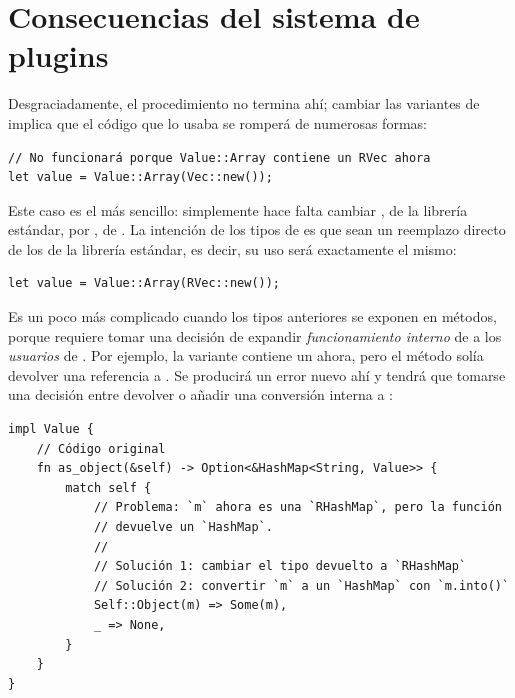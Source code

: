 \section{Consecuencias del sistema de plugins}

Desgraciadamente, el procedimiento no termina ahí; cambiar las variantes de
 implica que el código que lo usaba se romperá de numerosas formas:

\begin{verbatim}
// No funcionará porque Value::Array contiene un RVec ahora
let value = Value::Array(Vec::new());
\end{verbatim}

Este caso es el más sencillo: simplemente hace falta cambiar , de la
librería estándar, por , de \abistable. La intención de los tipos de
\abistable es que sean un reemplazo directo de los de la librería estándar, es
decir, su uso será exactamente el mismo:

\begin{verbatim}
let value = Value::Array(RVec::new());
\end{verbatim}

Es un poco más complicado cuando los tipos anteriores se exponen en métodos,
porque requiere tomar una decisión de expandir \emph{funcionamiento interno} de
 a los \emph{usuarios} de . Por ejemplo, la variante
 contiene un  ahora, pero el método
 solía devolver una referencia a . Se
producirá un error nuevo ahí y tendrá que tomarse una decisión entre devolver
 o añadir una conversión interna a :

\begin{verbatim}
impl Value {
    // Código original
    fn as_object(&self) -> Option<&HashMap<String, Value>> {
        match self {
            // Problema: `m` ahora es una `RHashMap`, pero la función
            // devuelve un `HashMap`.
            //
            // Solución 1: cambiar el tipo devuelto a `RHashMap`
            // Solución 2: convertir `m` a un `HashMap` con `m.into()`
            Self::Object(m) => Some(m),
            _ => None,
        }
    }
}
\end{verbatim}

